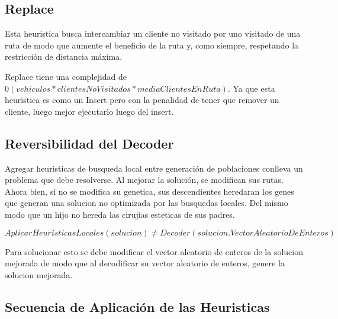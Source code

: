 \subsection{Replace}

Esta heuristica busca intercambiar un cliente no visitado por uno visitado de una ruta de modo que aumente el beneficio de la ruta y, como siempre, respetando la restricción de distancia máxima.

\bigskip

Replace tiene una complejidad de $0(vehiculos * clientesNoVisitados * mediaClientesEnRuta)$. Ya que esta heuristica es como un Insert pero con la penalidad de tener que remover un cliente, luego mejor ejecutarlo luego del insert.

\subsection{Reversibilidad del Decoder}

Agregar heuristicas de busqueda local entre generación de poblaciones conlleva un problema que debe resolverse. Al mejorar la solución, se modifican sus rutas. Ahora bien, si no se modifica su genetica, sus descendientes heredaran los genes que generan una solucion no optimizada por las busquedas locales. Del mismo modo que un hijo no hereda las cirujias esteticas de sus padres. 

\begin{equation*}
AplicarHeuristicasLocales(solucion) \neq Decoder(solucion.VectorAleatorioDeEnteros)
\end{equation*}

Para solucionar esto se debe modificar el vector aleatorio de enteros de la solucion mejorada de modo que al decodificar su vector aleatorio de enteros, genere la solucion mejorada.

\subsection{Secuencia de Aplicación de las Heuristicas}